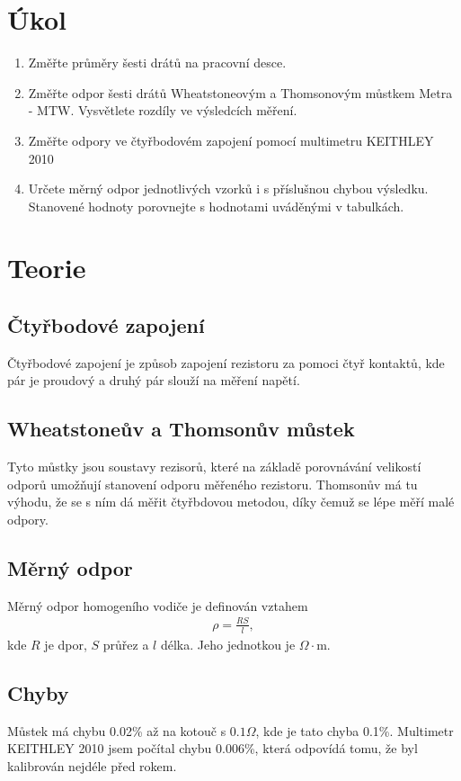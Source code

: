 \documentclass[a4paper,12pt]{article}
\begin{document}
\section{Úkol}
\noindent
\begin{enumerate}
    \item Změřte průměry šesti drátů na pracovní desce.
    \item Změřte odpor šesti drátů Wheatstoneovým a Thomsonovým můstkem Metra - MTW. Vysvětlete rozdíly ve výsledcích měření.
    \item Změřte odpory ve čtyřbodovém zapojení pomocí multimetru KEITHLEY 2010
    \item Určete měrný odpor jednotlivých vzorků i s příslušnou chybou výsledku. Stanovené hodnoty porovnejte s hodnotami uváděnými v tabulkách. 
\end{enumerate}

\section{Teorie}
\subsection{Čtyřbodové zapojení}
Čtyřbodové zapojení je způsob zapojení rezistoru za pomoci čtyř kontaktů, kde pár je proudový a druhý pár slouží na měření napětí.

\subsection{Wheatstoneův a Thomsonův můstek}
Tyto můstky jsou soustavy rezisorů, které na základě porovnávání velikostí odporů umožňují stanovení odporu měřeného rezistoru. Thomsonův má tu výhodu, 
že se s ním dá měřit čtyřbdovou metodou, díky čemuž se lépe měří malé odpory.

\subsection{Měrný odpor}
Měrný odpor homogeního vodiče je definován vztahem
\begin{eqnarray}
\rho=\frac{RS}{l},
\label{rho}
\end{eqnarray}
kde $R$ je dpor, $S$ průřez a $l$ délka. Jeho jednotkou je $\Omega\cdot$m.

\subsection{Chyby}
Můstek má chybu 0.02\% až na kotouč s $0.1\Omega$, kde je tato chyba 0.1\%. Multimetr KEITHLEY 2010 jsem počítal chybu 0.006\%, která odpovídá tomu, že byl kalibrován nejdéle před rokem.
\end{document}
